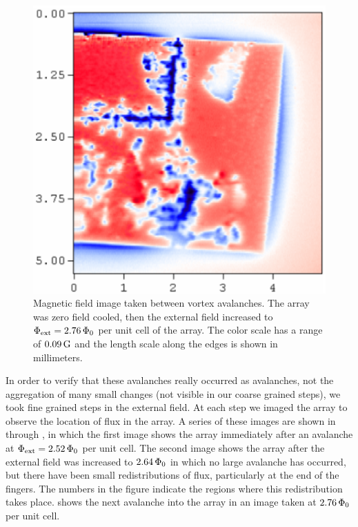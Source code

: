 \begin{figure}[p]
\includegraphics[width=5.7in]{figs/prospective/fig2_c_lg.ps}
\caption[Magnetic field images taken between vortex avalanches, at
$\Phiext = 2.76\,\Phinot$ per unit cell of the array.]
{Magnetic field image taken between vortex avalanches. The
array was zero field cooled, then the external field increased
to  $\Phiext = 2.76\,\Phinot$ per unit cell of the array. 
The color scale has a range of
$0.09\,\mathrm{G}$ and the length scale along the edges is shown in 
millimeters.
}
\label{fig:small_avalanche_steps_c}
\end{figure} 

In order to verify that these avalanches really occurred as avalanches, 
not the aggregation of many small changes
(not visible in our coarse grained steps),
we took fine grained steps in the external field.
At each step we imaged the array
to observe the location of flux in the array. A series of 
these images are shown in  through
, in which
the first image  
shows the array immediately after an avalanche at 
$\Phi_{\mathrm{ext}} = 2.52\,\Phi_0$ per unit cell. The second image
 shows the array after
the external field was increased to $2.64\,\Phi_0$ in which no large
avalanche has occurred, but there have been small redistributions
of flux, particularly at the end of the fingers. The numbers 
in the figure indicate the
regions where this redistribution takes place. 
 shows the next avalanche
into the array in an image taken at $2.76\,\Phi_0$ per unit cell. 

